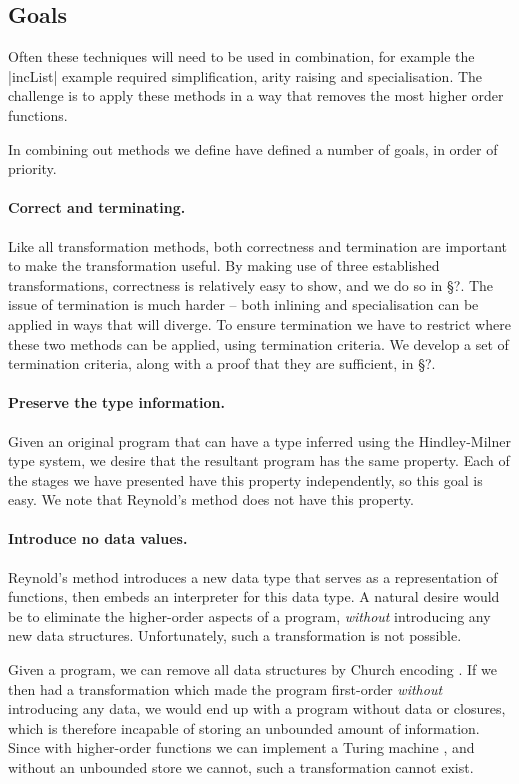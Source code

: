 \documentclass[preprint]{sigplanconf}
\begin{document}
\subsection{Goals}

Often these techniques will need to be used in combination, for example the |incList| example required simplification, arity raising and specialisation. The challenge is to apply these methods in a way that removes the most higher order functions.

In combining out methods we define have defined a number of goals, in order of priority.

\paragraph{Correct and terminating.} Like all transformation methods, both correctness and termination are important to make the transformation useful. By making use of three established transformations, correctness is relatively easy to show, and we do so in \S?. The issue of termination is much harder -- both inlining and specialisation can be applied in ways that will diverge. To ensure termination we have to restrict where these two methods can be applied, using termination criteria. We develop a set of termination criteria, along with a proof that they are sufficient, in \S?.

\paragraph{Preserve the type information.} Given an original program that can have a type inferred using the Hindley-Milner type system, we desire that the resultant program has the same property. Each of the stages we have presented have this property independently, so this goal is easy. We note that Reynold's method does not have this property.

\paragraph{Introduce no data values.} Reynold's method introduces a new data type that serves as a representation of functions, then embeds an interpreter for this data type. A natural desire would be to eliminate the higher-order aspects of a program, \textit{without} introducing any new data structures. Unfortunately, such a transformation is not possible.

Given a program, we can remove all data structures by Church encoding \cite{church_encode}. If we then had a transformation which made the program first-order \textit{without} introducing any data, we would end up with a program without data or closures, which is therefore incapable of storing an unbounded amount of information. Since with higher-order functions we can implement a Turing machine \cite{turing:halting}, and without an unbounded store we cannot, such a transformation cannot exist.
\end{document}
